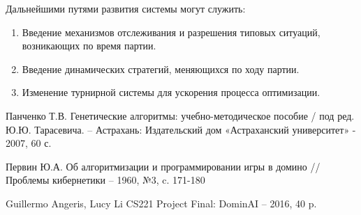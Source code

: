 \documentclass[11pt]{article}
\begin{document}
Дальнейшими путями развития системы могут служить: 
\begin{enumerate}
    \item Введение механизмов отслеживания и разрешения типовых ситуаций, возникающих по время партии. 
    \item Введение динамических стратегий, меняющихся по ходу партии. 
    \item Изменение турнирной системы для ускорения процесса оптимизации.
\end{enumerate}


\begin{thebibliography}{99}
Панченко Т.В. 
Генетические алгоритмы: учебно-методическое пособие / под ред. Ю.Ю. Тарасевича. – Астрахань: Издательский дом «Астраханский университет» 
- 2007, 60 с.

Первин Ю.А. 
Об алгоритмизации и программировании игры в домино // Проблемы кибернетики 
– 1960, №3, c. 171-180

Guillermo Angeris, Lucy Li 
CS221 Project Final: DominAI 
– 2016, 40 p.

\end{thebibliography}
\end{document}
